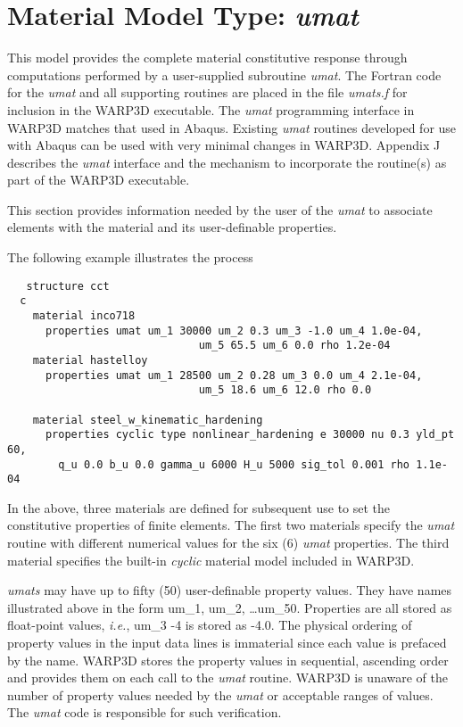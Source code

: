 \documentclass[11pt]{report}
\numberwithin{equation}{section}
\newcommand{\ie}{\emph{i.e.},\xspace}
\newcommand{\ti}{\emph}
\newcommand{\umat}{\ti{umat}\xspace}
\newcounter{sect

s}
\begin{document}
\section{Material Model Type: \textit{umat}}
\noindent This model provides the complete material
constitutive response through computations performed by a
user-supplied subroutine \umat. The Fortran code for the \umat
and all supporting routines are placed in the file \ti{umats.f} for inclusion
in the WARP3D executable. The \umat programming interface
in WARP3D matches that used in Abaqus. Existing \umat routines 
developed for use with Abaqus can be used with very minimal changes in
WARP3D. Appendix J describes the \umat interface and
the mechanism to incorporate the routine(s) as part of the WARP3D
executable.

This section provides information needed by the user of the 
\umat to associate elements with the material and 
its user-definable properties.

The following example illustrates the process
\small
\begin{verbatim}
   structure cct
  c
    material inco718
      properties umat um_1 30000 um_2 0.3 um_3 -1.0 um_4 1.0e-04,
                              um_5 65.5 um_6 0.0 rho 1.2e-04
    material hastelloy
      properties umat um_1 28500 um_2 0.28 um_3 0.0 um_4 2.1e-04,
                              um_5 18.6 um_6 12.0 rho 0.0 
                             
    material steel_w_kinematic_hardening
      properties cyclic type nonlinear_hardening e 30000 nu 0.3 yld_pt 60,
        q_u 0.0 b_u 0.0 gamma_u 6000 H_u 5000 sig_tol 0.001 rho 1.1e-04
 \end{verbatim}
 \normalsize

\noindent In the above, three materials are defined for subsequent use to set 
the constitutive properties of finite elements. The first two materials
specify the \umat routine with different numerical values for the
six (6) \umat properties. The third material specifies the
built-in \ti{cyclic} material model included in WARP3D.

\ti{umats} may have up to fifty (50) user-definable property values. They
have names illustrated above in the form um\_1, um\_2, \dots um\_50. Properties
are all stored as float-point values, \ie um\_3 -4 is stored as -4.0. The
physical ordering of property values in the input data lines
is immaterial since each value is prefaced by the name. WARP3D stores the property
values in sequential, ascending order and provides them on each call to the
\umat routine. WARP3D is unaware of the number of property values
needed by the \umat or acceptable ranges of values. The \umat code is
responsible for such verification.
\end{document}
